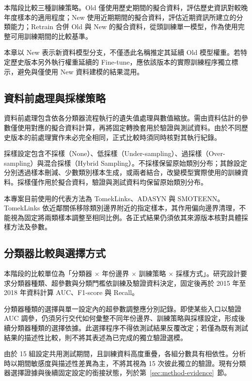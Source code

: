 本階段比較三種訓練策略。Old 僅使用歷史期間的擬合資料，評估歷史資訊對較晚年度樣本的適用程度；New 使用近期期間的擬合資料，評估近期資訊所建立的分類能力；Retrain 合併 Old 與 New 的擬合資料，從頭訓練單一模型，作為使用完整可用訓練期間的比較基準。

本章以 New 表示新資料模型分支，不僅憑此名稱推定其延續 Old 模型權重。若特定歷史版本另外執行權重延續的 Fine-tune，應依該版本的實際訓練程序獨立標示，避免與僅使用 New 資料建模的結果混用。

\subsection{資料前處理與採樣策略}

資料前處理包含依各分類器流程執行的遺失值處理與數值縮放。需由資料估計的參數僅使用對應的擬合資料計算，再將固定轉換套用於驗證與測試資料。由於不同歷史版本的前處理實作未必完全相同，正式比較時須同時核對其執行紀錄。

採樣設定包含不採樣（None）、低採樣（Under-sampling）、過採樣（Over-sampling）與混合採樣（Hybrid Sampling）。不採樣保留原始類別分布；其餘設定分別透過樣本刪減、少數類別樣本生成，或兩者結合，改變模型實際使用的訓練資料。採樣僅作用於擬合資料，驗證與測試資料均保留原始類別分布。

本專案目前使用的代表方法為 TomekLinks、ADASYN 與 SMOTEENN。TomekLinks 依近鄰關係移除類別邊界附近的指定樣本，其作用偏向邊界清理，不能視為固定將兩類樣本調整至相同比例。各正式結果仍須依其來源版本核對具體採樣方法及參數。

\subsection{分類器比較與選擇方式}

本階段的比較單位為「分類器 \ensuremath{\times} 年份邊界 \ensuremath{\times} 訓練策略 \ensuremath{\times} 採樣方式」。研究設計要求分類器種類、超參數與分類門檻依訓練及驗證資料決定，固定後再於 2015 年至 2018 年資料計算 AUC、F1-score 與 Recall。

分類器種類的選擇與單一設定內的超參數調整應分別記錄。即使某些入口以驗證 AUC 調參，仍須另行交代如何彙整不同年份邊界、訓練策略與採樣設定，形成後續分類器種類的選擇依據。此選擇程序不得依測試結果反覆改定；若僅為既有測試結果的描述性比較，則不將其表述為已完成的獨立驗證選模。

由於 15 組設定共用測試期間，且訓練資料高度重疊，各組分數具有相依性。分析時以期間敏感度與描述性差異為主，不將其視為 15 次彼此獨立的驗證。現有分類器選擇證據與後續固定設定的銜接狀態，列於第~\ref{sec:method-evidence}~節。

